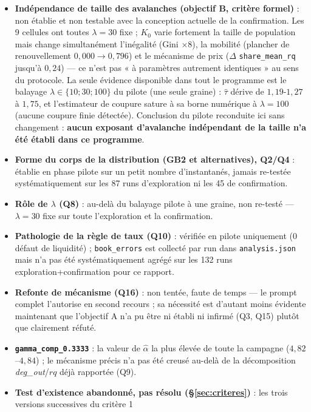 \documentclass[11pt,a4paper]{article}
\newcommand{\code}[1]{\texttt{#1}}
\begin{document}
\begin{itemize}
\item \textbf{Indépendance de taille des avalanches (objectif B, critère
  formel)} : non établie et non testable avec la conception actuelle de
  la confirmation. Les 9 cellules ont toutes $\lambda=30$ fixe ; $K_0$
  varie fortement la taille de population mais change simultanément
  l'inégalité (Gini $\times 8$), la mobilité (plancher de renouvellement
  $0{,}000 \to 0{,}796$) et le mécanisme de prix ($\Delta$
  \code{share\_mean\_rq} jusqu'à $0{,}24$) --- ce n'est pas « à
  paramètres autrement identiques » au sens du protocole. La seule
  évidence disponible dans tout le programme est le balayage
  $\lambda \in \{10;30;100\}$ du pilote (une seule graine) : $\hat\tau$
  dérive de $1{,}19$-$1{,}27$ à $1{,}75$, et l'estimateur de coupure
  sature à sa borne numérique à $\lambda=100$ (aucune coupure finie
  détectée). Conclusion du pilote reconduite ici sans changement :
  \textbf{aucun exposant d'avalanche indépendant de la taille n'a été
  établi dans ce programme}.
\item \textbf{Forme du corps de la distribution (GB2 et alternatives),
  Q2/Q4} : établie en phase pilote sur un petit nombre d'instantanés,
  jamais re-testée systématiquement sur les 87 runs d'exploration ni les
  45 de confirmation.
\item \textbf{Rôle de $\lambda$ (Q8)} : au-delà du balayage pilote à une
  graine, non re-testé --- $\lambda=30$ fixe sur toute l'exploration et
  la confirmation.
\item \textbf{Pathologie de la règle de taux (Q10)} : vérifiée en pilote
  uniquement (0 défaut de liquidité) ; \code{book\_errors} est collecté
  par run dans \code{analysis.json} mais n'a pas été systématiquement
  agrégé sur les 132 runs exploration+confirmation pour ce rapport.
\item \textbf{Refonte de mécanisme (Q16)} : non tentée, faute de temps
  --- le prompt complet l'autorise en second recours ; sa nécessité est
  d'autant moins évidente maintenant que l'objectif A n'a pu être ni
  établi ni infirmé (Q3, Q15) plutôt que clairement réfuté.
\item \textbf{\code{gamma\_comp\_0.3333}} : la valeur de $\hat\alpha$ la
  plus élevée de toute la campagne ($4{,}82$--$4{,}84$) ; le mécanisme
  précis n'a pas été creusé au-delà de la décomposition
  \emph{deg\_out}/$rq$ déjà rapportée (Q9).
\item \textbf{Test d'existence abandonné, pas résolu
  (\S\ref{sec:criteres})} : les trois versions successives du critère 1

\end{itemize}
\end{document}
